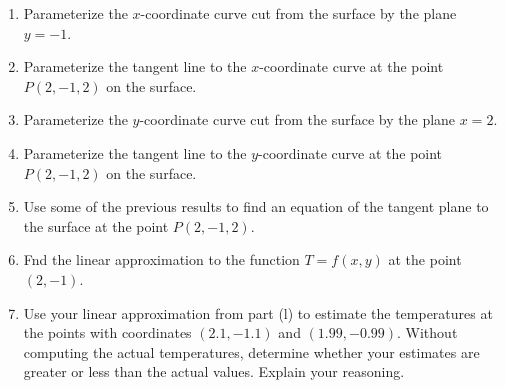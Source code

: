 \documentclass{ximera}
\begin{document}
\begin{example}
\begin{enumerate}
\begin{enumerate}
\item Parameterize the $x$-coordinate curve cut from the surface by the plane $y=-1$.

\item Parameterize the tangent line to the $x$-coordinate curve at the point $P(2,-1,2)$ on the surface.

\item Parameterize the $y$-coordinate curve cut from the surface by the plane $x=2$.

\item Parameterize the tangent line to the $y$-coordinate curve at the point $P(2,-1,2)$ on the surface.

\item Use some of the previous results to find an equation of the tangent plane to the surface at the point $P(2,-1,2)$.


\item Fnd the linear approximation to the function $T=f(x,y)$ at the point $(2,-1)$.

\item Use your linear approximation from part (l) to estimate the temperatures at the points with coordinates $(2.1, -1.1)$ and $(1.99, -0.99)$. Without computing the actual temperatures, determine whether your estimates are greater or less than the actual values. Explain your reasoning.

\end{enumerate}

\end{enumerate}

\end{example}
\end{document}
